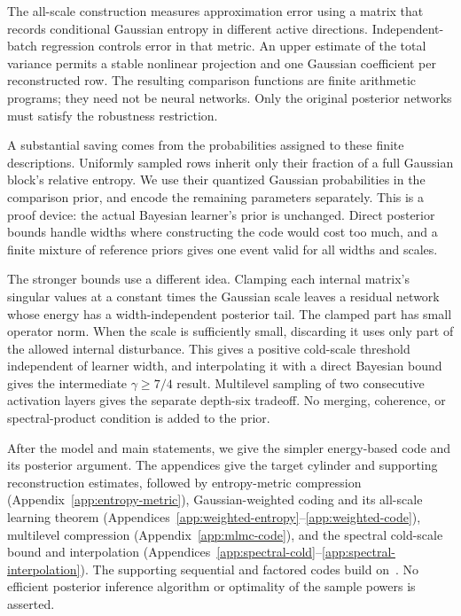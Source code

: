 \documentclass[11pt]{article}
\begin{document}
The all-scale construction measures approximation error using a matrix
that records conditional Gaussian entropy in different active
directions. Independent-batch regression controls error in that metric.
An upper estimate of the total variance permits a stable nonlinear
projection and one Gaussian coefficient per reconstructed row. The
resulting comparison functions are finite arithmetic programs; they
need not be neural networks. Only the original posterior networks must
satisfy the robustness restriction.

A substantial saving comes from the probabilities assigned to these
finite descriptions. Uniformly sampled rows inherit only their fraction
of a full Gaussian block's relative entropy. We use their quantized
Gaussian probabilities in the comparison prior, and encode the remaining
parameters separately. This is a proof device: the actual Bayesian
learner's prior is unchanged. Direct posterior bounds handle widths
where constructing the code would cost too much, and a finite mixture
of reference priors gives one event valid for all widths and scales.

The stronger bounds use a different idea. Clamping each internal
matrix's singular values at a constant times the Gaussian scale leaves
a residual network whose energy has a width-independent posterior tail.
The clamped part has small operator norm. When the scale is sufficiently
small, discarding it uses only part of the allowed internal disturbance.
This gives a positive cold-scale threshold independent of learner width,
and interpolating it with a direct Bayesian bound gives the intermediate
$\gamma\ge7/4$ result. Multilevel sampling of two consecutive activation
layers gives the separate depth-six tradeoff. No merging, coherence,
or spectral-product condition is added to the prior.

After the model and main statements, we give the simpler energy-based
code and its posterior argument. The appendices give the target
cylinder and supporting reconstruction estimates, followed by
entropy-metric compression (Appendix~\ref{app:entropy-metric}),
Gaussian-weighted coding and its all-scale learning theorem
(Appendices~\ref{app:weighted-entropy}--\ref{app:weighted-code}),
multilevel compression (Appendix~\ref{app:mlmc-code}), and the
spectral cold-scale bound and interpolation
(Appendices~\ref{app:spectral-cold}--\ref{app:spectral-interpolation}).
The supporting sequential and factored codes build on~\cite{sequential}.
No efficient posterior inference algorithm or optimality of the sample
powers is asserted.
\end{document}
